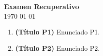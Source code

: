 \documentclass{article}
\begin{document}


\begin{center}
    \Huge{\textbf{Examen Recuperativo}}\\
    \normalsize
    \today
\end{center}

\begin{enumerate}
	\item \textbf{(Título P1)} Enunciado P1.
	\item \textbf{(Título P2)} Enunciado P2.
\end{enumerate}
    
\end{document}
